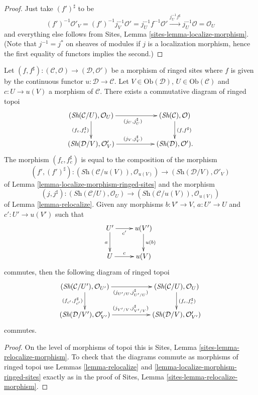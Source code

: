 \begin{proof}
Just take $(f')^\sharp$ to be
$$
(f')^{-1}\mathcal{O}'_V =
(f')^{-1}j_V^{-1}\mathcal{O}' =
j_U^{-1}f^{-1}\mathcal{O}' \xrightarrow{j_U^{-1}f^\sharp}
j_U^{-1}\mathcal{O} = \mathcal{O}_U
$$
and everything else follows from
Sites, Lemma \ref{sites-lemma-localize-morphism}.
(Note that $j^{-1} = j^*$ on sheaves of modules if $j$ is a localization
morphism, hence the first equality of functors implies the second.)
\end{proof}

\begin{lemma}
\label{lemma-relocalize-morphism-ringed-sites}
Let
$(f, f^\sharp) :
(\mathcal{C}, \mathcal{O})
\longrightarrow
(\mathcal{D}, \mathcal{O}')$
be a morphism of ringed sites where $f$ is given by the continuous
functor $u : \mathcal{D} \to \mathcal{C}$.
Let $V \in \text{Ob}(\mathcal{D})$, $U \in \text{Ob}(\mathcal{C})$
and $c : U \to u(V)$ a morphism of $\mathcal{C}$.
There exists a commutative diagram of ringed topoi
$$
\xymatrix{
(\textit{Sh}(\mathcal{C}/U), \mathcal{O}_U)
\ar[rr]_{(j_U, j_U^\sharp)} \ar[d]_{(f_c, f_c^\sharp)} & &
(\textit{Sh}(\mathcal{C}), \mathcal{O}) \ar[d]^{(f, f^\sharp)} \\
(\textit{Sh}(\mathcal{D}/V), \mathcal{O}'_V)
\ar[rr]^{(j_V, j_V^\sharp)} & &
(\textit{Sh}(\mathcal{D}), \mathcal{O}').
}
$$
The morphism $(f_c, f_c^\sharp)$
is equal to the composition of the morphism
$$
(f', (f')^\sharp) :
(\textit{Sh}(\mathcal{C}/u(V)), \mathcal{O}_{u(V)})
\longrightarrow
(\textit{Sh}(\mathcal{D}/V), \mathcal{O}'_V)
$$
of
Lemma \ref{lemma-localize-morphism-ringed-sites}
and the morphism
$$
(j, j^\sharp) :
(\textit{Sh}(\mathcal{C}/U), \mathcal{O}_U)
\to
(\textit{Sh}(\mathcal{C}/u(V)), \mathcal{O}_{u(V)})
$$
of
Lemma \ref{lemma-relocalize}.
Given any morphisms $b : V' \to V$, $a : U' \to U$ and
$c' : U' \to u(V')$ such that
$$
\xymatrix{
U' \ar[r]_-{c'} \ar[d]_a & u(V') \ar[d]^{u(b)} \\
U \ar[r]^-c & u(V)
}
$$
commutes, then the following diagram of ringed topoi
$$
\xymatrix{
(\textit{Sh}(\mathcal{C}/U'), \mathcal{O}_{U'})
\ar[rr]_{(j_{U'/U}, j_{U'/U}^\sharp)} \ar[d]_{(f_{c'}, f_{c'}^\sharp)} & &
(\textit{Sh}(\mathcal{C}/U), \mathcal{O}_U)
\ar[d]^{(f_c, f_c^\sharp)} \\
(\textit{Sh}(\mathcal{D}/V'), \mathcal{O}'_{V'})
\ar[rr]^{(j_{V'/V}, j_{V'/V}^\sharp)} & &
(\textit{Sh}(\mathcal{D}/V), \mathcal{O}'_{V'})
}
$$
commutes.
\end{lemma}

\begin{proof}
On the level of morphisms of topoi this is
Sites, Lemma \ref{sites-lemma-relocalize-morphism}.
To check that the diagrams commute as morphisms of ringed topoi use
Lemmas \ref{lemma-relocalize} and
\ref{lemma-localize-morphism-ringed-sites}
exactly as in the proof of
Sites, Lemma \ref{sites-lemma-relocalize-morphism}.
\end{proof}
















